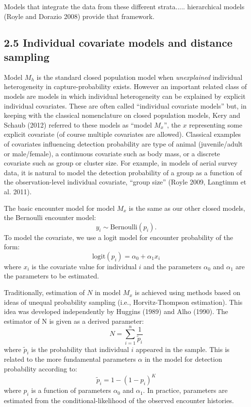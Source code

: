 \documentclass{book}
\begin{document}
Models that integrate the data from these different
strata..... hierarchical models (Royle and Dorazio 2008) provide that
framework. 



\subsection*{2.5 Individual covariate models and distance sampling}

Model $M_h$ is the standard closed population model when {\it
  unexplained} individual heterogeneity in capture-probability
exists. However an important related class of models are models in
which individual heterogeneity can be explained by explicit individual
covariates. These are often called ``individual covariate models''
but, in keeping with the classical nomenclature on closed population
models, Kery and Schaub (2012) referred to these models as ``model
$M_{x}$'', the $x$ representing some explicit covariate (of course
multiple covariates are allowed).  Classical examples of covariates
influencing detection probability are type of animal (juvenile/adult
or male/female), a continuous covariate such as body mass, or a
discrete covariate such as group or cluster size. For example, in
models of aerial survey data, it is natural to model the detection
probability of a group as a function of the observation-level
individual covariate, ``group size'' (Royle 2009, Langtimm et
al. 2011).

The basic encounter model for model $M_x$ is the same as our other
closed models, the Bernoulli encounter model:
\[
y_{i} \sim \mbox{Bernoulli}(p_{i}).
\]
To model the covariate, we use a logit model for encounter probability
of the form:
\begin{equation}
 \mbox{logit}(p_{i}) = \alpha_0 + \alpha_1 x_{i}
\end{equation}
where $x_i$ is the covariate value for individual $i$ and the
parameters $\alpha_0$ and $\alpha_1$ are the parameters to be
estimated.

Traditionally, estimation of $N$ in model $M_{x}$ is
achieved using methods based on ideas of unequal probability sampling
(i.e., Horvitz-Thompson estimation). This idea was developed
independently by Huggins (1989) and Alho (1990). The estimator of N is
given as a derived parameter:
\[
\hat{N} = \sum_{i=1}^{n} \frac{1}{\tilde{p}_{i}}
\]
where $\tilde{p}_{i}$ is the probability that individual $i$ appeared
in the sample.   This is related to the more fundamental parameters
$\alpha$ in the model for detection probability according to:
\[
\tilde{p}_{i}  = 1- (1-p_{i})^K
\]
where $p_{i}$ is a function of parameters $\alpha_{0}$ and $\alpha_{1}$.
In practice, parameters are
estimated from the conditional-likelihood of the observed encounter
histories.
\end{document}
